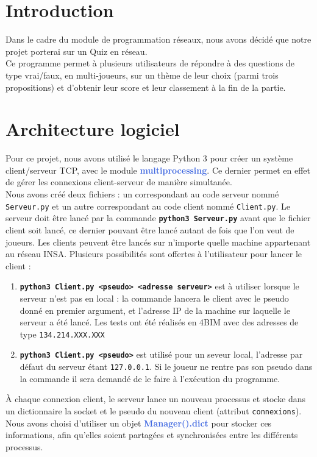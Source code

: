 \documentclass[12pt, a4paper]{article}
\begin{document}
\section{Introduction}

Dans le cadre du module de programmation réseaux, nous avons décidé que notre projet porterai sur un Quiz en réseau.\\
Ce programme permet à plusieurs utilisateurs de répondre à des questions de type vrai/faux, en multi-joueurs, sur un thème de leur choix (parmi trois propositions) et d'obtenir leur score et leur classement à la fin de la partie.

\section{Architecture logiciel}
Pour ce projet, nous avons utilisé le langage Python 3 pour créer un système client/serveur TCP, avec le module \textbf{\textcolor{RoyalBlue}{multiprocessing}}. Ce dernier permet en effet de gérer les connexions client-serveur de manière simultanée. \\
Nous avons créé deux fichiers : un correspondant au code serveur nommé \texttt{Serveur.py} et un autre correspondant au code client nommé \texttt{Client.py}. Le serveur doit être lancé par la commande \texttt{\textbf{python3 Serveur.py}} avant que le fichier client soit lancé, ce dernier pouvant être lancé autant de fois que l'on veut de joueurs. Les clients peuvent être lancés sur n'importe quelle machine appartenant au réseau INSA. Plusieurs possibilités sont offertes à l'utilisateur pour lancer le client :
\begin{enumerate}
    \item \texttt{\textbf{python3 Client.py <pseudo> <adresse serveur>}} est à utiliser lorsque le serveur n'est pas en local : la commande lancera le client avec le pseudo donné en premier argument, et l'adresse IP de la machine sur laquelle le serveur a été lancé.  Les tests ont été réalisés en 4BIM avec des adresses de type \texttt{134.214.XXX.XXX}
    \item \texttt{\textbf{python3 Client.py <pseudo>}} est utilisé pour un seveur local, l'adresse par défaut du serveur étant \texttt{127.0.0.1}. Si le joueur ne rentre pas son pseudo dans la commande il sera demandé de le faire à l'exécution du programme.
\end{enumerate}
À chaque connexion client, le serveur lance un nouveau processus et stocke dans un dictionnaire la socket et le pseudo du nouveau client (attribut \texttt{connexions}). Nous avons choisi d'utiliser un objet \textbf{\textcolor{RoyalBlue}{Manager().dict}} pour stocker ces informations, afin qu'elles soient partagées et synchronisées entre les différents processus. 
\end{document}
